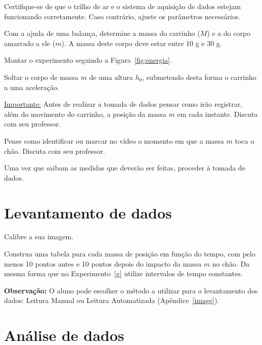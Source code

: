 \begin{num}
\item Certifique-se de que o trilho de ar e o sistema de aquisição de dados estejam funcionando corretamente. Caso contrário, ajuste os parâmetros necessários. 
\item Com a ajuda de uma balança, determine a massa do carrinho ($M$) e a do corpo amarrado a ele ($m$). A massa deste corpo deve estar entre 10 g e 30 g.
\item Montar o experimento seguindo a Figura~\ref{fig:energia}.
\item Soltar o corpo de massa $m$ de uma altura $h_0$, submetendo desta forma o carrinho a uma aceleração.

\underline {Importante:} 
Antes de realizar a tomada de dados pensar como irão registrar, além do movimento do carrinho, a posição da massa $m$ em cada instante. Discuta com seu professor. 

\item Pense como identificar ou marcar no vídeo o momento em que a massa $m$ toca o chão.  Discuta com seu professor.

\item Uma vez que saibam as medidas que deverão ser feitas, proceder à tomada de dados.
\end{num} 


\vspace{-0.5cm}
\section*{Levantamento de dados}

\begin{num}
\item Calibre a sua imagem.
\item Construa uma tabela para cada massa de posição em função do tempo, com pelo menos 10 pontos antes e 10 pontos depois do impacto da massa $m$ no chão. Da mesma forma que no Experimento~\ref{g} utilize intervalos de tempo constantes. 
\end{num}

\vspace{-0.5cm}
{\bf Observação:} O aluno pode escolher o método a utilizar para o levantamento dos dados: Leitura Manual ou Leitura Automatizada (Apêndice~\ref{image}).



\section*{Análise de dados}
